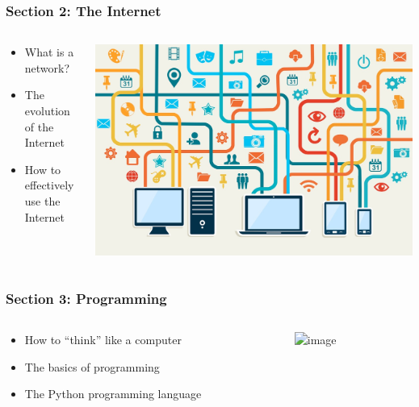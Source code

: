 \documentclass{beamer}
\begin{document}
\begin{frame}
    \frametitle{Section 2: The Internet}
    \begin{columns}
        \begin{column}{0.45\linewidth}
            \begin{itemize}
                \item What is a network?
                \item The evolution of the Internet
                \item How to effectively use the Internet
            \end{itemize}
        \end{column}
        \begin{column}{0.45\linewidth}
            \centering
            \includegraphics[width=\linewidth]{internet.jpg}
        \end{column}
    \end{columns}
\end{frame}

\begin{frame}
    \frametitle{Section 3: Programming}
    \begin{columns}
        \begin{column}{0.45\linewidth}
            \begin{itemize}
                \item<1-> How to ``think'' like a computer
                \item<2-> The basics of programming
                \item<3-> The Python programming language
            \end{itemize}
        \end{column}
        \begin{column}{0.45\linewidth}
            \centering
            \includegraphics<3>[width=\linewidth]{python.png}
        \end{column}
    \end{columns}
\end{frame}
\end{document}
